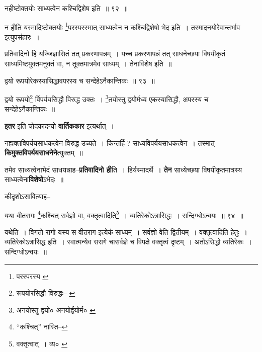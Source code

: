 \documentclass[article,12pt,a4paper]{memoir}
\begin{document}
	  \bigskip
	  \begingroup
	

	  \pstart नहीष्टोक्तयोः साध्यत्वेन कश्चिद्विशेष इति ॥ ९२ ॥
	\pend
      
	  \endgroup
	 

	  \pstart न हीति यस्मादिष्टोक्तयोः \footnote{परस्परस्य \cite{dp-msD} \cite{dp-msB} \cite{dp-edP} \cite{dp-edH} \cite{dp-edE}}परस्परस्मात् साध्यत्वेन न कश्चिद्विशेषो भेद इति । तस्मादनयोरेवान्तर्भाव इत्युपसंहारः ।
	\pend
       

	  \pstart प्रतिवादिनो हि यज्जिज्ञासितं तत् प्रकरणापन्नम् । यच्च प्रकरणापन्नं तत् साधनेच्छया विषयीकृतं साध्यमिष्टमुक्तमनुक्तं वा, न तूक्तमात्रमेव साध्यम् । तेनाविशेष इति ॥
	\pend
       
	  \bigskip
	  \begingroup
	

	  \pstart द्वयो रूपयोरेकस्यासिद्धावपरस्य च सन्देहेऽनैकान्तिकः ॥ ९३ ॥
	\pend
      
	  \endgroup
	 

	  \pstart द्वयो रूपयो\footnote{रूपयोरसिद्धौ विरुद्धः--\cite{dp-msA} \cite{dp-msB} \cite{dp-msC} \cite{dp-msD} \cite{dp-edP} \cite{dp-edH} \cite{dp-edN}} र्विपर्ययसिद्धौ विरुद्ध उक्तः । \footnote{अनयोस्तु द्वयो० \cite{dp-msD} अनयोर्द्वयोर्म० \cite{dp-msA} \cite{dp-msB} \cite{dp-edP} \cite{dp-edH} \cite{dp-edE} \cite{dp-edN}}तयोस्तु द्वयोर्मध्य एकस्यासिद्धौ, अपरस्य च सन्देहेऽनैकान्तिकः ॥
	\pend
      
	  \endgroup
	

	  \pstart \textbf{इतर} इति चोदकादन्यो \textbf{वार्तिककार} इत्यर्थात् ।
	\pend
      

	  \pstart नह्यक्तविपर्ययसाधकत्वेन विरुद्ध उच्यते । किन्तर्हि ? साध्यविपर्ययसाधकत्वेन । तस्मात् \textbf{किमुक्तविपर्ययसाधनेने}त्युक्तम् ॥
	\pend
      

	  \pstart तमेव साध्यत्वेनाभेदं साधयन्नाह--\textbf{प्रतिवादिनो ही}ति । हिर्यस्मादर्थे । \textbf{तेन} साध्येच्छया विषयीकृतमात्रस्य साध्यत्वेना\textbf{विशेषो}ऽभेदः ॥
	\pend
      \leavevmode{}
	  \bigskip
	  \begingroup
	

	  \pstart कीदृशोऽसावित्याह--
	\pend
       
	  \bigskip
	  \begingroup
	

	  \pstart यथा वीतरागः \footnote{“कश्चित्” नास्ति--\cite{dp-msC}}कश्चित् सर्वज्ञो वा, वक्तृत्वादिति\footnote{वक्तृत्वात् । व्य० \cite{dp-msC}} । व्यतिरेकोऽत्रासिद्धः । सन्दिग्धोऽन्वयः ॥ ९४ ॥
	\pend
      
	  \endgroup
	 

	  \pstart यथेति । विगतो रागो यस्य स वीतराग इत्येकं साध्यम् । सर्वज्ञो वेति द्वितीयम् । वक्तृत्वादिति हेतुः । व्यतिरेकोऽत्रासिद्ध इति । स्वात्मन्येव सरागे चासर्वज्ञे च विपक्षे वक्तृत्वं दृष्टम् । अतोऽसिद्धो व्यतिरेकः । सन्दिग्धोऽन्वयः ॥
	\pend
       
\end{document}
